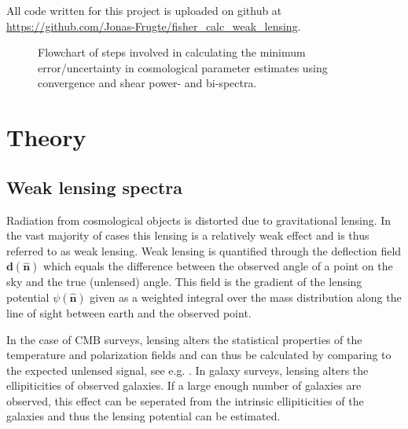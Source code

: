 \documentclass[11pt]{article} %
\begin{document}
All code written for this project is uploaded on github at \url{https://github.com/Jonas-Frugte/fisher_calc_weak_lensing}.



\begin{figure}[h!]
    \centering
    
    \caption{Flowchart of steps involved in calculating the minimum error/uncertainty in cosmological parameter estimates using convergence and shear power- and bi-spectra.}
    \label{fig:flowchart}
\end{figure}

\section{Theory}
\subsection{Weak lensing spectra}
Radiation from cosmological objects is distorted due to gravitational lensing. In the vast majority of cases this lensing is a relatively weak effect and is thus referred to as weak lensing. Weak lensing is quantified through the deflection field $\mathbf d(\hat {\mathbf n})$ which equals the difference between the observed angle of a point on the sky and the true (unlensed) angle. This field is the gradient of the lensing potential $\psi(\hat {\mathbf n})$ given as a weighted integral over the mass distribution along the line of sight between earth and the observed point.

In the case of CMB surveys, lensing alters the statistical properties of the temperature and polarization fields and can thus be calculated by comparing to the expected unlensed signal, see e.g. \cite{cmblensingestimator}. In galaxy surveys, lensing alters the ellipiticities of observed galaxies. If a large enough number of galaxies are observed, this effect can be seperated from the intrinsic ellipiticities of the galaxies and thus the lensing potential can be estimated.
\end{document}
